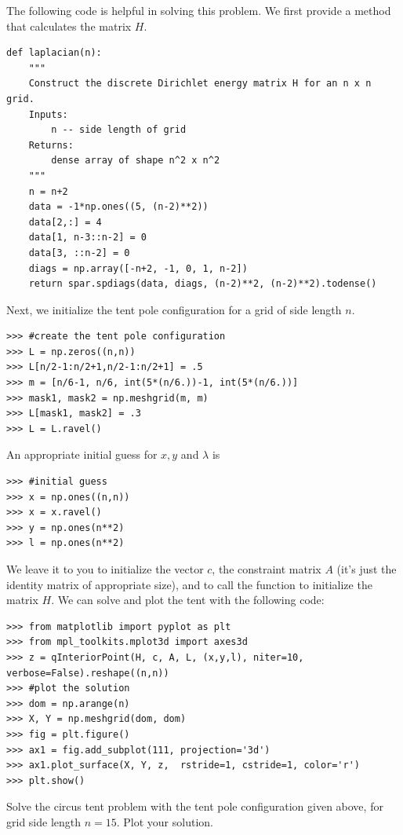 The following code is helpful in solving this problem. We first provide a method that calculates the matrix $H$.
\begin{lstlisting}
def laplacian(n):
    """
    Construct the discrete Dirichlet energy matrix H for an n x n grid.
    Inputs:
        n -- side length of grid
    Returns:
        dense array of shape n^2 x n^2
    """
    n = n+2
    data = -1*np.ones((5, (n-2)**2))
    data[2,:] = 4
    data[1, n-3::n-2] = 0
    data[3, ::n-2] = 0
    diags = np.array([-n+2, -1, 0, 1, n-2])
    return spar.spdiags(data, diags, (n-2)**2, (n-2)**2).todense()
\end{lstlisting}
Next, we initialize the tent pole configuration for a grid of side length $n$.
\begin{lstlisting}
>>> #create the tent pole configuration
>>> L = np.zeros((n,n))
>>> L[n/2-1:n/2+1,n/2-1:n/2+1] = .5
>>> m = [n/6-1, n/6, int(5*(n/6.))-1, int(5*(n/6.))]
>>> mask1, mask2 = np.meshgrid(m, m)
>>> L[mask1, mask2] = .3
>>> L = L.ravel()
\end{lstlisting}
An appropriate initial guess for $x, y$ and $\lambda$ is
\begin{lstlisting}
>>> #initial guess
>>> x = np.ones((n,n))
>>> x = x.ravel()
>>> y = np.ones(n**2)
>>> l = np.ones(n**2)
\end{lstlisting}
We leave it to you to initialize the vector $c$, the constraint matrix $A$ (it's just the identity matrix of
appropriate size), and to call the function  to initialize the matrix $H$.
We can solve and plot the tent with the following code:
\begin{lstlisting}
>>> from matplotlib import pyplot as plt
>>> from mpl_toolkits.mplot3d import axes3d
>>> z = qInteriorPoint(H, c, A, L, (x,y,l), niter=10, verbose=False).reshape((n,n))
>>> #plot the solution
>>> dom = np.arange(n)
>>> X, Y = np.meshgrid(dom, dom)
>>> fig = plt.figure()
>>> ax1 = fig.add_subplot(111, projection='3d')
>>> ax1.plot_surface(X, Y, z,  rstride=1, cstride=1, color='r')
>>> plt.show()
\end{lstlisting}

\begin{problem}
Solve the circus tent problem with the tent pole configuration given above, for grid side length $n = 15$.
Plot your solution.
\end{problem}

